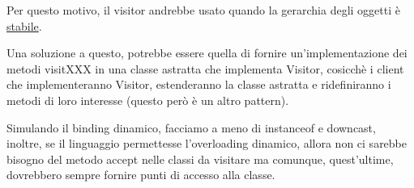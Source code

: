 Per questo motivo, il visitor andrebbe usato quando la gerarchia degli oggetti è \underline{stabile}.

Una soluzione a questo, potrebbe essere quella di fornire un'implementazione dei metodi visitXXX in una classe astratta che implementa Visitor, cosicchè i client 
che implementeranno Visitor, estenderanno la classe astratta e ridefiniranno i metodi di loro interesse (questo però è un altro pattern).
\smallskip

Simulando il binding dinamico, facciamo a meno di instanceof e downcast, inoltre, se il linguaggio permettesse l'overloading dinamico, allora non ci sarebbe bisogno 
del metodo accept nelle classi da visitare ma comunque, quest'ultime, dovrebbero sempre fornire punti di accesso alla classe.